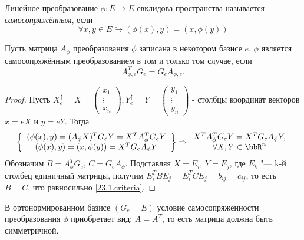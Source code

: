 \begin{defn}
  Линейное преобразование $\phi\colon E \rightarrow E$ евклидова пространства называется \textit{самосопряжённым}, если
  \begin{equation}\label{23.1.selfadjoint}
  \forall x,y \in E \hookrightarrow (\phi(x),y)=(x,\phi(y))
  \end{equation}
\end{defn}
  \begin{thm} Пусть матрица $A_\phi$ преобразования $\phi$ записана в некотором базисе $e$. $\phi$ является самосопряжённым преобразованием в том и только том случае, если
  \begin{equation}\label{23.1.criteria}
  A^T_{\phi,e}G_e=G_eA_{\phi,e}.
  \end{equation}  
  \end{thm}    
  \begin{proof}
  Пусть $X_e^\uparrow=X=
  \begin{pmatrix}
  x_1 \\ \vdots \\ x_n
  \end{pmatrix},Y_e^\uparrow=Y=
  \begin{pmatrix}
  y_1 \\ \vdots \\ y_n
  \end{pmatrix}$ - столбцы координат векторов $x=eX$ и $y=eY$. Тогда
  \begin{equation*}
  \left\lbrace \begin{array}{crl}
    (\phi(x),y)=(A_\phi X)^TG_eY=X^TA_\phi^TG_eY \\
    (\phi(x),y)=(x,\phi(y))=X^TG_eA_\phi Y \\
    \end{array}\right\rbrace \Rightarrow  \begin{array}{crl}
    X^TA_\phi^TG_eY=X^TG_eA_\phi Y, \\ \forall X,Y\in \bbR^n
  \end{array}     
  \end{equation*}   
  Обозначим $B=A_\phi^TG_e$, $C=G_eA_\phi$. Подставляя $X=E_i$, $Y=E_j$, где $E_k$ "--- k-й столбец единичный матрицы, получим $E_i^TBE_j=E_i^TCE_j=b_{ij}=c_{ij}$, то есть $B=C$, что равносильно \eqref{23.1.criteria}.
  \end{proof}
  \begin{cons}
  В ортонормированном базисе $(G_e=E)$ условие самосопряжённости преобразования $\phi$ приобретает вид: $A=A^T$, то есть матрица должна быть симметричной.
  \end{cons}

